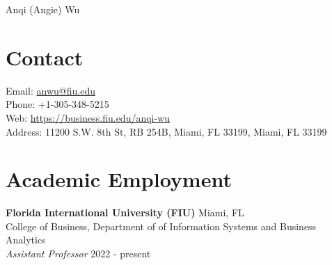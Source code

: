 \documentclass[margin,line]{resume}
\begin{document}
{\sc \Large Anqi (Angie) Wu}
\begin{resume}

\pagestyle{plain}
\setcounter{page}{1}



    \section{\mysidestyle Contact}
    Email: \href{mailto:anwu@fiu.edu}{anwu@fiu.edu}\\
    Phone: +1-305-348-5215\\
    Web: \url{https://business.fiu.edu/anqi-wu}\\
    Address: 11200 S.W. 8th St, RB 254B, Miami, FL 33199, Miami, FL 33199
    
\section{\mysidestyle Academic Employment} 
         \textbf{Florida International University (FIU)} \hfill Miami, FL\\
         College of Business, Department of of Information Systems and Business Analytics\\
         {\sl Assistant Professor} \hfill 2022 - present
    

\end{resume}
\end{document}
